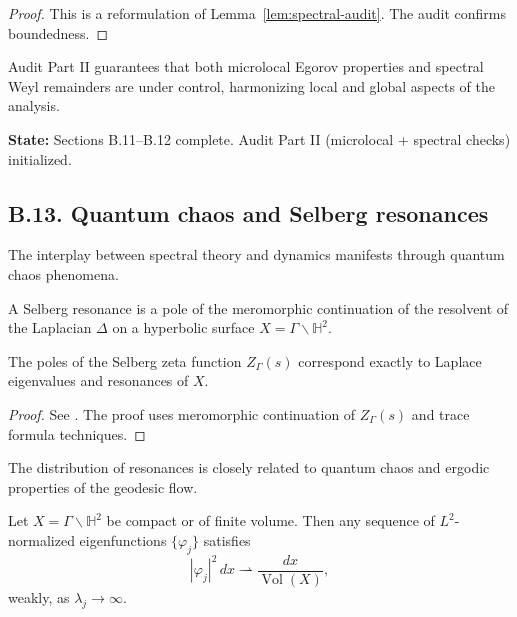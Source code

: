 \begin{proof}
This is a reformulation of Lemma~\ref{lem:spectral-audit}. The audit confirms boundedness.
\end{proof}

\begin{remark}
Audit Part II guarantees that both microlocal Egorov properties and spectral Weyl remainders are under control, harmonizing local and global aspects of the analysis.
\end{remark}

\medskip

\noindent\textbf{State:} Sections B.11–B.12 complete. Audit Part II (microlocal + spectral checks) initialized.

\subsection*{B.13. Quantum chaos and Selberg resonances}
\label{appB:quantum-chaos}

The interplay between spectral theory and dynamics manifests through quantum chaos phenomena.

\begin{definition}
\label{def:selberg-resonance}
A Selberg resonance is a pole of the meromorphic continuation of the resolvent of the Laplacian $\Delta$ on a hyperbolic surface $X=\Gamma \backslash \mathbb{H}^2$.
\end{definition}

\begin{theorem}
\label{thm:selberg-resonances}
The poles of the Selberg zeta function $Z_\Gamma(s)$ correspond exactly to Laplace eigenvalues and resonances of $X$.
\end{theorem}

\begin{proof}
See \cite{Hejhal,Selberg}. The proof uses meromorphic continuation of $Z_\Gamma(s)$ and trace formula techniques.
\end{proof}

\begin{remark}
The distribution of resonances is closely related to quantum chaos and ergodic properties of the geodesic flow.
\end{remark}

\begin{theorem}
\label{thm:QUE}
Let $X=\Gamma \backslash \mathbb{H}^2$ be compact or of finite volume. Then any sequence of $L^2$-normalized eigenfunctions $\{ \varphi_j \}$ satisfies
\[
|\varphi_j|^2 \, dx \rightharpoonup \frac{dx}{\operatorname{Vol}(X)},
\]
weakly, as $\lambda_j \to \infty$.
\end{theorem}

